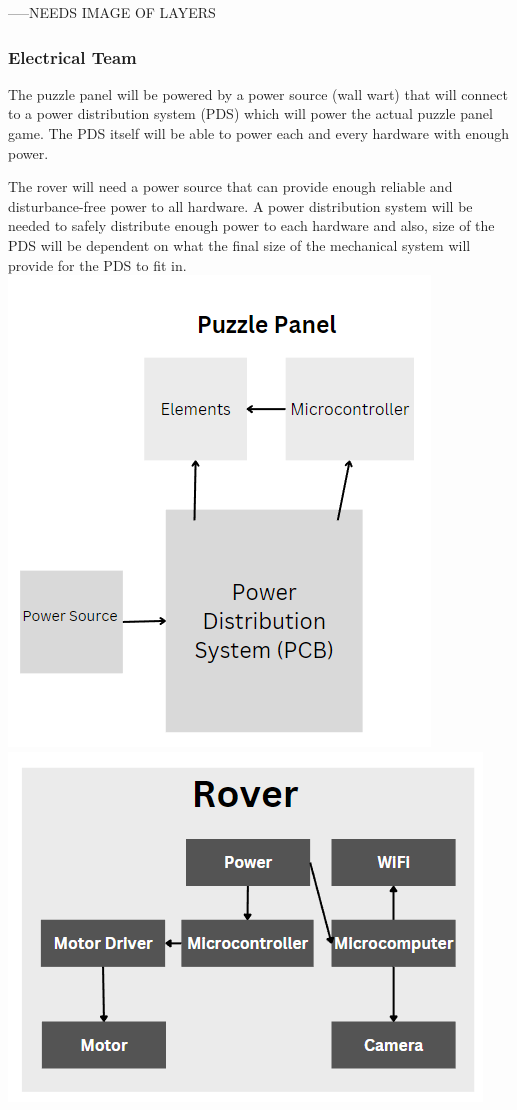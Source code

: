 \documentclass[a4paper, 10pt]{article}
\begin{document}
		-----NEEDS IMAGE OF LAYERS
		
		\subsubsection{Electrical Team}
		The puzzle panel will be powered by a power source (wall wart) that will connect to a power distribution system (PDS) which will power the actual puzzle panel game. The PDS itself will be able to power each and every hardware with enough power.

		The rover will need a power source that can provide enough reliable and disturbance-free power to all hardware. A power distribution system will be needed to safely distribute enough power to each hardware and also, size of the PDS will be dependent on what the final size of the mechanical system will provide for the PDS to fit in.  
		\includegraphics[scale=0.8]{Photos/Puzzle Panel tier 1 schematic}
		\includegraphics[scale=0.8]{Photos/Rover tier 1 schematic}
\end{document}
